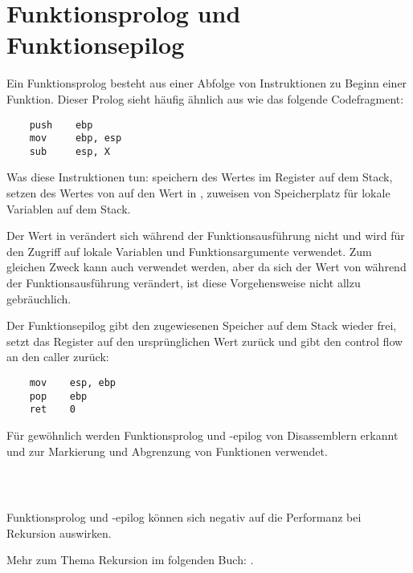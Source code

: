 \section{Funktionsprolog und Funktionsepilog}
\label{sec:prologepilog}

Ein Funktionsprolog besteht aus einer Abfolge von Instruktionen zu Beginn einer
Funktion. Dieser Prolog sieht häufig ähnlich aus wie das folgende Codefragment:

\begin{lstlisting}
    push    ebp
    mov     ebp, esp
    sub     esp, X
\end{lstlisting}

Was diese Instruktionen tun: speichern des Wertes im \EBP Register auf dem
Stack, setzen des Wertes von \EBP auf den Wert in \ESP, zuweisen von Speicherplatz für lokale
Variablen auf dem Stack.

Der Wert in \EBP verändert sich während der Funktionsausführung nicht und wird
für den Zugriff auf lokale Variablen und Funktionsargumente verwendet. Zum
gleichen Zweck kann auch \ESP verwendet werden, aber da sich der Wert von \ESP
während der Funktionsausführung verändert, ist diese Vorgehensweise nicht allzu
gebräuchlich.

Der Funktionsepilog gibt den zugewiesenen Speicher auf dem Stack wieder frei,
setzt das \EBP Register auf den ursprünglichen Wert zurück und gibt den control
flow an den \gls{caller} zurück:

\begin{lstlisting}
    mov    esp, ebp
    pop    ebp
    ret    0
\end{lstlisting}

Für gewöhnlich werden Funktionsprolog und -epilog von Disassemblern erkannt und
zur Markierung und Abgrenzung von Funktionen verwendet.

　
\subsection{\Rekursion}

\myindex{\Recursion}
Funktionsprolog und -epilog können sich negativ auf die Performanz bei Rekursion
auswirken. 

Mehr zum Thema Rekursion im folgenden Buch: .
